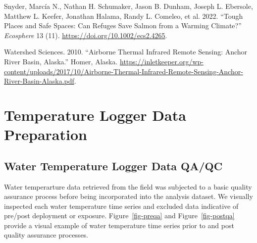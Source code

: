 \documentclass[
  letterpaper,
  DIV=11,
  numbers=noendperiod]{scrreprt}
\newlength{\cslhangindent}
\newlength{\cslentryspacingunit} %
\newenvironment{CSLReferences}[2] %
 {%
  \setlength{\parindent}{0pt}
  \ifodd #1
  \let\oldpar\par
  \def\par{\hangindent=\cslhangindent\oldpar}
  \fi
  \setlength{\parskip}{#2\cslentryspacingunit}
 }%
 {}
\begin{document}
\begin{CSLReferences}{1}{0}
\leavevmode{}%
Snyder, Marcía N., Nathan H. Schumaker, Jason B. Dunham, Joseph L.
Ebersole, Matthew L. Keefer, Jonathan Halama, Randy L. Comeleo, et al.
2022. {``Tough Places and Safe Spaces: Can Refuges Save Salmon from a
Warming Climate?''} \emph{Ecosphere} 13 (11).
\url{https://doi.org/10.1002/ecs2.4265}.

\leavevmode{}%
Watershed Sciences. 2010. {``Airborne Thermal Infrared Remote Sensing:
Anchor River Basin, Alaska.''} Homer, Alaska.
\url{https://inletkeeper.org/wp-content/uploads/2017/10/Airborne-Thermal-Infrared-Remote-Sensing-Anchor-River-Basin-Alaska.pdf}.

\end{CSLReferences}

\appendix
{}

\hypertarget{temperature-logger-data-preparation}{%
\chapter{Temperature Logger Data
Preparation}\label{temperature-logger-data-preparation}}

\hypertarget{water-temperature-logger-data-qaqc}{%
\section{Water Temperature Logger Data
QA/QC}\label{water-temperature-logger-data-qaqc}}

Water temperarture data retrieved from the field was subjected to a
basic quality assurance process before being incorporated into the
analysis dataset. We visually inspected each water temperature time
series and excluded data indicative of pre/post deployment or exposure.
Figure~\ref{fig-preqa} and Figure~\ref{fig-postqa} provide a visual
example of water temperature time series prior to and post quality
assurance processes.
\end{document}
